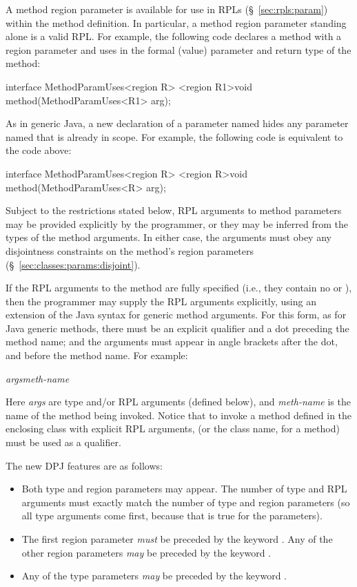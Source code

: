  A method region parameter is
available for use in RPLs (\S~\ref{sec:rpls:param}) within the method
definition.  In particular, a method region parameter standing alone
is a valid RPL.  For example, the following code declares a method
 with a region parameter  and uses  in the
formal (value) parameter and return type of the method:
%
\begin{dpjlisting}
interface MethodParamUses<region R> {
    <region R1>void method(MethodParamUses<R1> arg);
}
\end{dpjlisting}
%
As in generic Java, a new declaration of a parameter named 
hides any parameter named  that is already in scope.  For
example, the following code is equivalent to the code above:
%
\begin{dpjlisting}
interface MethodParamUses<region R> {
    <region R>void method(MethodParamUses<R> arg);
}
\end{dpjlisting}
%

 Subject to
the restrictions stated below, RPL arguments to method parameters may
be provided explicitly by the programmer, or they may be inferred from
the types of the method arguments.  In either case, the arguments must
obey any disjointness constraints on the method's region parameters
(\S~\ref{sec:classes:params:disjoint}).

 If the RPL arguments
to the method are fully specified (i.e., they contain no \kwd{*} or
), then the programmer may supply the RPL arguments explicitly,
using an extension of the Java syntax for generic method arguments.
For this form, as for Java generic methods, there must be an explicit
qualifier and a dot preceding the method name; and the arguments must
appear in angle brackets after the dot, and before the method name.
For example:
%
\begin{description}
\item {}\emph{args}\kwd{>}\emph{meth-name}\kwd{()}
\end{description}
%
Here \emph{args} are type and/or RPL arguments (defined below), and
\emph{meth-name} is the name of the method being invoked.  Notice that
to invoke a method defined in the enclosing class with explicit RPL
arguments,  (or the class name, for a  method)
must be used as a qualifier.

The new DPJ features are as follows:
%
\begin{itemize}
%
\item Both type and region parameters may appear.  The number of type
  and RPL arguments must exactly match the number of type and region
  parameters (so all type arguments come first, because that is true
  for the parameters).
%
\item The first region parameter \emph{must} be preceded by the
  keyword .  Any of the other region parameters \emph{may}
  be preceded by the keyword .
%
\item Any of the type parameters \emph{may} be preceded by the keyword
  .
%
\end{itemize}
%

